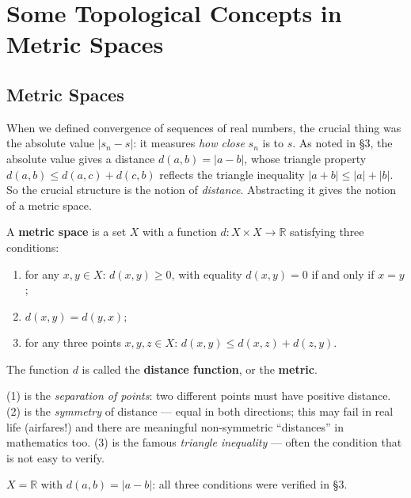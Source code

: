 \documentclass[11pt]{report}
\begin{document}

\section{Some Topological Concepts in Metric Spaces}

\subsection{Metric Spaces}

When we defined convergence of sequences of real numbers, the crucial thing was the absolute value $|s_n - s|$: it measures \emph{how close} $s_n$ is to $s$. As noted in \S 3, the absolute value gives a distance $d(a,b) = |a - b|$, whose triangle property $d(a,b) \leq d(a,c) + d(c,b)$ reflects the triangle inequality $|a+b| \leq |a| + |b|$. So the crucial structure is the notion of \emph{distance}. Abstracting it gives the notion of a metric space.

\begin{defbox}
A \textbf{metric space} is a set $X$ with a function $d: X \times X \to \mathbb{R}$ satisfying three conditions:
\begin{enumerate}[label=(\arabic*)]
    \item for any $x, y \in X$: $d(x,y) \geq 0$, with equality $d(x,y) = 0$ if and only if $x = y$;
    \item $d(x,y) = d(y,x)$;
    \item for any three points $x, y, z \in X$: \quad $d(x,y) \leq d(x,z) + d(z,y)$.
\end{enumerate}
The function $d$ is called the \textbf{distance function}, or the \textbf{metric}.
\end{defbox}

\begin{rembox}
(1) is the \emph{separation of points}: two different points must have positive distance. (2) is the \emph{symmetry} of distance --- equal in both directions; this may fail in real life (airfares!) and there are meaningful non-symmetric ``distances'' in mathematics too. (3) is the famous \emph{triangle inequality} --- often the condition that is not easy to verify.
\end{rembox}

\begin{exbox}
$X = \mathbb{R}$ with $d(a,b) = |a - b|$: all three conditions were verified in \S 3.
\end{exbox}
\end{document}
